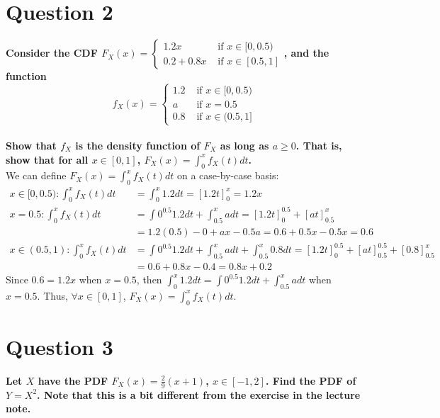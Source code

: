 \documentclass{article}
\begin{document}
\section*{Question 2}
\textbf{Consider the CDF $F_X(x)=\begin{cases}1.2x&\text{   if } x\in[0,0.5) \\ 0.2+0.8x&\text{   if } x\in[0.5,1] \end{cases}$, and the function}
\[
	f_X(x)=\begin{cases}1.2&\text{   if } x\in[0,0.5) \\ a&\text{   if } x=0.5 \\ 0.8&\text{   if } x\in(0.5,1]\end{cases}
\]
\smallskip \\
\textbf{Show that $f_X$ is the density function of $F_X$ as long as $a\geq0$. That is, show that for all $x\in[0,1]$, $F_X(x)=\int_0^x f_X(t)dt$.}
\bigskip \\
We can define $F_X(x)=\int_0^x f_X(t)dt$ on a case-by-case basis:
\begin{align*}
	x\in[0,0.5): 	\int_0^x f_X(t)dt	&=\int_0^x 1.2dt = [1.2t]_0^x = 1.2x																\\
	x=0.5:			\int_0^x f_X(t)dt	&=\int0^0.5 1.2dt + \int_0.5^x a dt = [1.2t]^0.5_0 + [at]^x_0.5 									\\
										&= 1.2(0.5) - 0 + ax - 0.5a	=0.6 + 0.5x - 0.5x = 0.6												\\
	x\in(0.5,1):	\int_0^x f_X(t)dt	&=\int0^0.5 1.2dt + \int_0.5^x a dt + \int_0.5^x 0.8dt = [1.2t]^0.5_0 + [at]^0.5_0.5 +[0.8]^x_0.5	\\
										&= 0.6 + 0.8x - 0.4 = 0.8x + 0.2
\end{align*}
Since $0.6=1.2x$ when $x=0.5$, then $\int_0^x 1.2dt=\int0^0.5 1.2dt + \int_0.5^x a dt$ when $x=0.5$. Thus,  $\forall x\in[0,1]$, $F_X(x)=\int_0^x f_X(t)dt$.



\section*{Question 3}
\textbf{Let $X$ have the PDF $F_X(x)=\frac{2}{9}(x+1)$, $x\in[-1,2]$. Find the PDF of $Y=X^2$. Note that this is a bit different from the exercise in the lecture note.}
\bigskip \\



\end{document}
